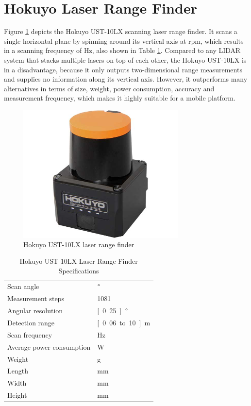 \section{Hokuyo Laser Range Finder}
Figure \ref{pics:hokuyo} depicts the Hokuyo UST-10LX scanning laser range finder. It scans a single horizontal plane by spinning around its vertical axis at \unit[2400]{rpm}, which results in a scanning frequency of \unit[40]{Hz}, also shown in Table \ref{tab:hokuyo}. Compared to any LIDAR system that stacks multiple lasers on top of each other, the Hokuyo UST-10LX is in a disadvantage, because it only outputs two-dimensional range measurements and supplies no information along its vertical axis. However, it outperforms many alternatives in terms of size, weight, power consumption, accuracy and measurement frequency, which makes it highly suitable for a mobile platform.


\begin{figure}[h]
   \centering
   \includegraphics[width=0.75\textwidth]{images/hokuyo.jpg}
   \caption{Hokuyo UST-10LX laser range finder}
   \label{pics:hokuyo}
\end{figure}

\begin{table}[h]
\begin{center}
 \caption{Hokuyo UST-10LX Laser Range Finder Specifications}\vspace{1ex}
 \label{tab:hokuyo}
 \begin{tabular}{ll}
 \hline
 Scan angle & \unit[250]{$\degree$} \\
 Measurement steps & 1081 \\
 Angular resolution & \unit[0.25]{$\degree$} \\
 Detection range & \unit[0.06 to 10]{m} \\
 Scan frequency & \unit[40]{Hz} \\
 Average power consumption & \unit[3]{W} \\
 Weight & \unit[130]{g} \\
 Length & \unit[50]{mm} \\
 Width & \unit[50]{mm} \\
 Height &  \unit[70]{mm} \\
 \hline
 \end{tabular}
\end{center}
\end{table}

